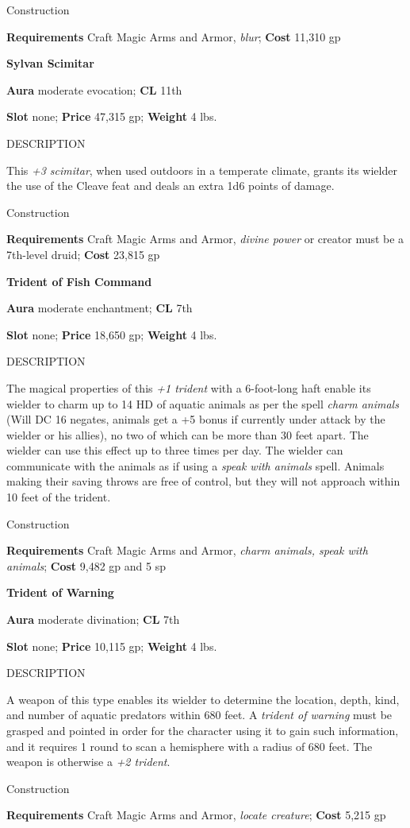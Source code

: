 Construction
				
\textbf{Requirements} Craft Magic Arms and Armor, \textit{blur}; \textbf{Cost }11,310 gp
				
\textbf{Sylvan Scimitar}
				
\textbf{Aura} moderate evocation;\textbf{ CL }11th
				
\textbf{Slot} none; \textbf{Price} 47,315 gp; \textbf{Weight} 4 lbs.
				
DESCRIPTION
				
This \textit{+3 scimitar}, when used outdoors in a temperate climate, grants its wielder the use of the Cleave feat and deals an extra 1d6 points of damage. 
				
Construction
				
\textbf{Requirements} Craft Magic Arms and Armor, \textit{divine power} or creator must be a 7th-level druid; \textbf{Cost }23,815 gp
				
\textbf{Trident of Fish Command}
				
\textbf{Aura} moderate enchantment;\textbf{ CL }7th
				
\textbf{Slot} none; \textbf{Price} 18,650 gp; \textbf{Weight} 4 lbs.
				
DESCRIPTION
				
The magical properties of this \textit{+1 trident} with a 6-foot-long haft enable its wielder to charm up to 14 HD of aquatic animals as per the spell \textit{charm animals} (Will DC 16 negates, animals get a +5 bonus if currently under attack by the wielder or his allies), no two of which can be more than 30 feet apart. The wielder can use this effect up to three times per day. The wielder can communicate with the animals as if using a \textit{speak with animals} spell. Animals making their saving throws are free of control, but they will not approach within 10 feet of the trident. 
				
Construction
				
\textbf{Requirements} Craft Magic Arms and Armor, \textit{charm animals, speak with animals}; \textbf{Cost }9,482 gp and 5 sp
				
\textbf{Trident of Warning}
				
\textbf{Aura} moderate divination;\textbf{ CL }7th
				
\textbf{Slot} none; \textbf{Price} 10,115 gp; \textbf{Weight} 4 lbs.
				
DESCRIPTION
				
A weapon of this type enables its wielder to determine the location, depth, kind, and number of aquatic predators within 680 feet. A \textit{trident of warning} must be grasped and pointed in order for the character using it to gain such information, and it requires 1 round to scan a hemisphere with a radius of 680 feet. The weapon is otherwise a \textit{+2 trident}. 
				
Construction
				
\textbf{Requirements} Craft Magic Arms and Armor, \textit{locate creature}; \textbf{Cost }5,215 gp	

